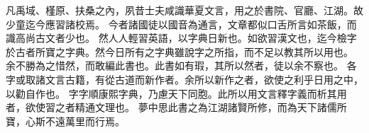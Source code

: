 凡禹域、槿原、扶桑之內，夙昔士夫咸識華夏文言，用之於書院、官廳、江湖。故少童迄今應習諸校焉。
今者諸國徒以國音為通言，文章都似口舌所言如茶飯，而識高尚古文者少也。
然人人輕習英語，以字典日新也。如欲習漢文也，迄今檢字於古者所寶之字典。然今日所有之字典雖說字之所指，而不足以教其所以用也。
余不勝為之惜然，而敢編此書也。此書如有瑕，其所以然者，徒以余不察也。
各字或取諸文言古籍，有從古道而新作者。余所以新作之者，欲使之利乎日用之中，以勸自作也。
字字順康熙字典，乃慮天下同胞。此所以用文言釋字義而析其用者，欲使習之者精通文理也。
夢中思此書之為江湖諸賢所修，而為天下諸儒所寶，心斯不遠萬里而行焉。

